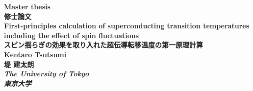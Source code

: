 

%
%
\begin{titlepage}
\thispagestyle{empty}
\begin{spacing}{1.5}
\begin{center}
\vspace*{30truemm}
%
\textbf{\large Master thesis \\ 修士論文}\\
%
\vspace*{20truemm}
%
\textbf{\LARGE First-principles calculation of superconducting transition temperatures
including the effect of spin fluctuations}\\
\vspace*{5truemm}
{\Large \textbf{スピン揺らぎの効果を取り入れた超伝導転移温度の第一原理計算}}\\
%
\vspace*{50truemm}
%
\textbf{\large Kentaro Tsutsumi \\
堤 建太朗}\\
\vspace*{10truemm}
\textbf{\textit{The University of Tokyo \\ 東京大学}}

\end{center}
\end{spacing}
\end{titlepage}
%
%

